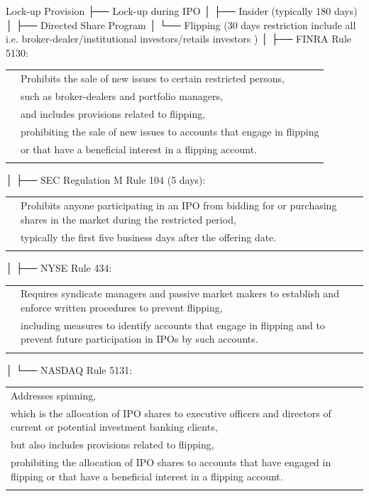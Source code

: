 \documentclass[11pt]{article}
\begin{document}
Lock-up Provision
├── Lock-up during IPO
│   ├── Insider (typically 180 days)
│   ├── Directed Share Program
│   └── Flipping (30 days restriction include all i.e. broker-dealer/institutional investors/retails investors )
│       ├── FINRA Rule 5130:
\begin{center}
\begin{tabular}{ll}
 & Prohibits the sale of new issues to certain restricted persons,\\[0pt]
 & such as broker-dealers and portfolio managers,\\[0pt]
 & and includes provisions related to flipping,\\[0pt]
 & prohibiting the sale of new issues to accounts that engage in flipping\\[0pt]
 & or that have a beneficial interest in a flipping account.\\[0pt]
\\[0pt]
\end{tabular}
\end{center}
│       ├── SEC Regulation M Rule 104 (5 days):
\begin{center}
\begin{tabular}{ll}
 & Prohibits anyone participating in an IPO from bidding for or purchasing shares in the market during the restricted period,\\[0pt]
 & typically the first five business days after the offering date.\\[0pt]
\\[0pt]
\end{tabular}
\end{center}
│       ├── NYSE Rule 434:
\begin{center}
\begin{tabular}{ll}
 & Requires syndicate managers and passive market makers to establish and enforce written procedures to prevent flipping,\\[0pt]
 & including measures to identify accounts that engage in flipping and to prevent future participation in IPOs by such accounts.\\[0pt]
\\[0pt]
\end{tabular}
\end{center}
│       └── NASDAQ Rule 5131:
\begin{center}
\begin{tabular}{l}
Addresses spinning,\\[0pt]
which is the allocation of IPO shares to executive officers and directors of current or potential investment banking clients,\\[0pt]
but also includes provisions related to flipping,\\[0pt]
prohibiting the allocation of IPO shares to accounts that have engaged in flipping or that have a beneficial interest in a flipping account.\\[0pt]
\\[0pt]
\end{tabular}
\end{center}
\end{document}
